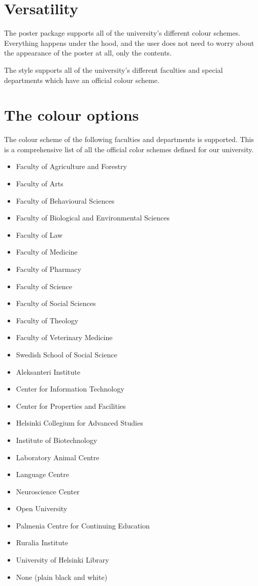 \documentclass[a0paper,smallertitle]{HYposter}
\begin{document}
\section*{Versatility}

The poster package supports all of the university's different colour schemes.
Everything happens under the hood, and the user does not need to worry about
the appearance of the poster at all, only the contents.

The style supports all of the university's different faculties and special
departments which have an official colour scheme.


\section*{The colour options}

The colour scheme of the following faculties and departments is supported. This
is a comprehensive list of all the official color schemes defined for our
university.

\begin{itemize}
    \item Faculty of Agriculture and Forestry 
    \item Faculty of Arts 
    \item Faculty of Behavioural Sciences 
    \item Faculty of Biological and Environmental Sciences 
    \item Faculty of Law 
    \item Faculty of Medicine 
    \item Faculty of Pharmacy 
    \item Faculty of Science 
    \item Faculty of Social Sciences 
    \item Faculty of Theology 
    \item Faculty of Veterinary Medicine 
    \item Swedish School of Social Science
    \item Aleksanteri Institute
    \item Center for Information Technology
    \item Center for Properties and Facilities
    \item Helsinki Collegium for Advanced Studies
    \item Institute of Biotechnology
    \item Laboratory Animal Centre
    \item Language Centre
    \item Neuroscience Center
    \item Open University
    \item Palmenia Centre for Continuing Education
    \item Ruralia Institute
    \item University of Helsinki Library
    \item None (plain black and white)
\end{itemize}
\end{document}
